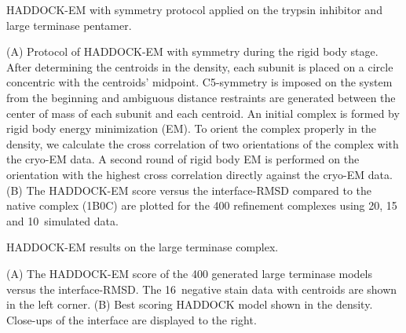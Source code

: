 \caption{HADDOCK-EM with symmetry protocol applied on the trypsin inhibitor and
large terminase pentamer.}
{(A) Protocol of HADDOCK-EM with symmetry during the rigid body stage. After
determining the centroids in the density, each subunit is placed on a circle
concentric with the centroids' midpoint. C5-symmetry is imposed on the
system from the beginning and ambiguous distance restraints are generated
between the center of mass of each subunit and each centroid. An initial complex is formed
by rigid body energy minimization (EM). To orient the complex properly in the
density, we calculate the cross correlation of two orientations of the complex
with the cryo-EM data. A second round of rigid body EM is performed on the
orientation with the highest cross correlation directly against the cryo-EM
data. 
(B) The HADDOCK-EM score versus the interface-RMSD compared to the native complex
(1B0C) are plotted for the 400 refinement complexes using 20, 15 and 10\Angstrom\
simulated data.}
\stopbuffer

\caption{HADDOCK-EM results on the large terminase complex.}
{(A) The HADDOCK-EM score of the 400 generated large terminase models versus
the interface-RMSD. The 16\Angstrom\ negative stain data with centroids are shown
in the left corner.
(B) Best scoring HADDOCK model shown in the density. Close-ups of
the interface are displayed to the right.}
\stopbuffer

